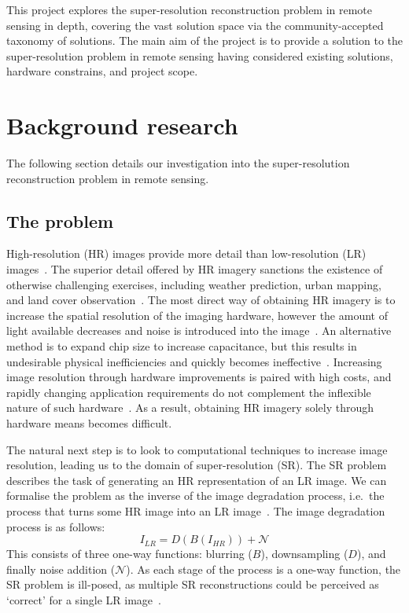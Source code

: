 This project explores the super-resolution reconstruction problem in remote sensing in depth, covering the vast solution space via the community-accepted taxonomy of solutions. The main aim of the project is to provide a solution to the super-resolution problem in remote sensing having considered existing solutions, hardware constrains, and project scope.

\section{Background research}\label{sec:background_research}
The following section details our investigation into the super-resolution reconstruction problem in remote sensing.

\subsection{The problem}\label{subsec:the_problem}
High-resolution (HR) images provide more detail than low-resolution (LR) images~\cite{urbanMapping}. The superior detail offered by HR imagery sanctions the existence of otherwise challenging exercises, including weather prediction, urban mapping, and land cover observation~\cite{urbanMapping, mapping, cloudCover, vegetationMapping}. The most direct way of obtaining HR imagery is to increase the spatial resolution of the imaging hardware, however the amount of light available decreases and noise is introduced into the image~\cite{superResOverview}. An alternative method is to expand chip size to increase capacitance, but this results in undesirable physical inefficiencies and quickly becomes ineffective~\cite{superResOverview}. Increasing image resolution through hardware improvements is paired with high costs, and rapidly changing application requirements do not complement the inflexible nature of such hardware~\cite{remoteSensingGANsReview}. As a result, obtaining HR imagery solely through hardware means becomes difficult.

The natural next step is to look to computational techniques to increase image resolution, leading us to the domain of super-resolution (SR). The SR problem describes the task of generating an HR representation of an LR image. We can formalise the problem as the inverse of the image degradation process, i.e.\ the process that turns some HR image into an LR image~\cite{imageDeg}. The image degradation process is as follows:
\begin{equation}\label{eq:image_deg}
    I_{LR} = D(B(I_{HR})) + \mathcal{N}
\end{equation}
This consists of three one-way functions: blurring ($B$), downsampling ($D$), and finally noise addition ($\mathcal{N}$). As each stage of the process is a one-way function, the SR problem is ill-posed, as multiple SR reconstructions could be perceived as `correct' for a single LR image~\cite{remoteSensingDeepLearningReview}.

